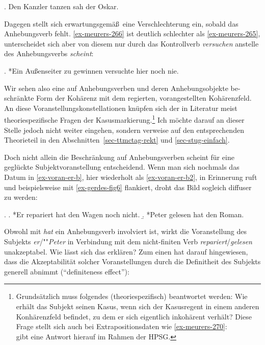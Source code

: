 \ex. Den Kanzler tanzen sah der Oskar. \hfill \citep[(275)]{Meurers:99}\label{ex-meurers-275}

Dagegen stellt sich erwartungsgemä\ss\ eine Verschlechterung ein, sobald das Anhebungsverb fehlt. \ref{ex-meurers-266} ist deutlich schlechter als \ref{ex-meurers-265}, unterscheidet sich aber von diesem nur durch das Kontrollverb {\it versuchen} anstelle des Anhebungsverbs {\it scheint}: 

\ex. *Ein Au\ss enseiter zu gewinnen versuchte hier noch nie. \hfill \citep[(266)]{Meurers:99}\label{ex-meurers-266}

Wir sehen also eine auf Anhebungsverben und deren Anhebungsobjekte be-\linebreak schränkte Form der Kohärenz mit dem regierten, vorangestellten Kohärenzfeld. An diese Voranstellungskonstellationen knüpfen sich der in Literatur meist theoriespezifische Fragen der Kasusmarkierung.\footnote{Grundsätzlich muss folgendes (theoriespezifisch) beantwortet werden: Wie erhält das Subjekt seinen Kasus, wenn sich der Kasusregent in einem anderen Konhärenzfeld befindet, zu dem er sich eigentlich inkohärent verhält? Diese Frage stellt sich auch bei Extrapositionsdaten wie \ref{ex-meurers-270}:\\
\citet[316ff]{Meurers:99} gibt eine Antwort hierauf im Rahmen der HPSG.} Ich möchte darauf an dieser Stelle jedoch nicht weiter eingehen, sondern verweise auf den entsprechenden Theorieteil in den Abschnitten~\ref{sec-ttmctag-rekt} und \ref{sec-stug-einfach}.

Doch nicht allein die Beschränkung auf Anhebungsverben scheint für eine geglückte Subjektvoranstellung entscheidend. Wenn man sich nochmals das Datum in \ref{ex-voran-er-b}, hier wiederholt als \ref{ex-voran-er-b2}, in Erinnerung ruft und beispielsweise mit \ref{ex-gerdes-fig6} flankiert, droht das Bild sogleich diffuser zu werden: 

\ex. 
\a. *Er repariert hat den Wagen noch nicht.\label{ex-voran-er-b2} 
\b. *Peter gelesen hat den Roman. \hfill \citep[Figure~6]{Gerdes:04}\label{ex-gerdes-fig6} 

Obwohl mit {\it hat} ein Anhebungsverb involviert ist, wirkt die Voranstellung des Subjekts {\it er}/""{\it Peter} in Verbindung mit dem nicht-finiten Verb {\it repariert}/{\it gelesen} unakzeptabel. Wie lässt sich das erklären? Zum einen hat \cite{Haider:90} darauf hingewiesen, dass die Akzeptabilität solcher Voranstellungen durch die Definitheit des Subjekts generell abnimmt ("`definiteness effect"'):   

